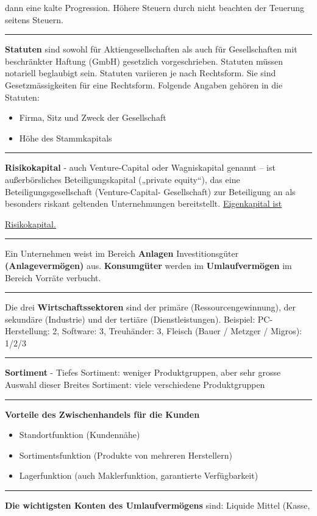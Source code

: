 \documentclass{article} %
\begin{document}
\begin{minipage}[t][0.8\textheight]{0.97\textwidth}
\begin{multicols*}{4}
\begin{flushleft}
{{			dann eine kalte Progression. Höhere Steuern
			durch nicht beachten der Teuerung seitens
			Steuern.}
			\noindent\rule{\linewidth}{0.4pt}
			\textbf{Statuten} sind sowohl für Aktiengesellschaften
			als auch für Gesellschaften mit beschränkter
			Haftung (GmbH) gesetzlich vorgeschrieben.
			Statuten müssen notariell beglaubigt sein.
			Statuten variieren je nach Rechtsform. Sie sind
			Gesetzmässigkeiten für eine Rechtsform.
			Folgende Angaben gehören in die Statuten:
			\begin{itemize}
				\item Firma, Sitz und Zweck der Gesellschaft
				\item Höhe des Stammkapitals
			\end{itemize}
			\noindent\rule{\linewidth}{0.4pt}
			\textbf{Risikokapital} - auch Venture-Capital oder
			Wagniskapital genannt – ist außerbörsliches
			Beteiligungskapital („private equity“), das eine
			Beteiligungsgesellschaft (Venture-Capital-
			Gesellschaft) zur Beteiligung an als besonders
			riskant geltenden Unternehmungen bereitstellt.
			\underline{Eigenkapital ist} \par\noindent\underline{Risikokapital.}
			\newline\noindent\rule{\linewidth}{0.4pt}
			Ein Unternehmen weist im Bereich \textbf{Anlagen}
			Investitionsgüter \textbf{(Anlagevermögen)} aus.
			\textbf{Konsumgüter} werden im \textbf{Umlaufvermögen} im
			Bereich Vorräte verbucht.
			\noindent\rule{\linewidth}{0.4pt}
			Die drei \textbf{Wirtschaftssektoren} sind der primäre
			(Ressourcengewinnung), der sekundäre (Industrie)
			und der tertiäre (Dienstleistungen).
			Beispiel: PC-Herstellung: 2, Software: 3,
			Treuhänder: 3, Fleisch (Bauer / Metzger /
			Migros): 1/2/3
			\noindent\rule{\linewidth}{0.4pt}
			\textbf{Sortiment} - 
			Tiefes Sortiment: weniger Produktgruppen, aber
			sehr grosse Auswahl dieser
			Breites Sortiment: viele verschiedene
			Produktgruppen
			\noindent\rule{\linewidth}{0.4pt}
			\textbf{Vorteile des Zwischenhandels für die Kunden}
			\begin{itemize}
				\item Standortfunktion (Kundennähe)
				\item Sortimentsfunktion (Produkte von mehreren
				Herstellern)
				\item Lagerfunktion (auch Maklerfunktion, garantierte
				Verfügbarkeit)
			\end{itemize}
			\noindent\rule{\linewidth}{0.4pt}
			\textbf{Die wichtigsten Konten des
			Umlaufvermögens} sind: Liquide Mittel (Kasse,
}
\end{flushleft}
\end{multicols*}
\end{minipage}
\end{document}
